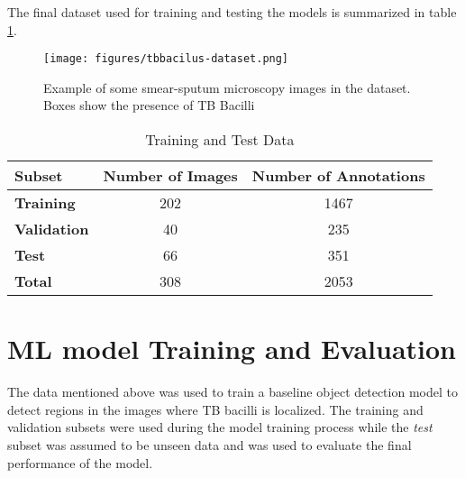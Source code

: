 \documentclass[../main.tex]{subfiles}
\begin{document}
    The final dataset used for training and testing the models is summarized in table \ref{tab:training-test-data}.

 
    \begin{figure}[ht]
     \centering
     \texttt{[image: figures/tbbacilus-dataset.png]}
     \caption{Example of some smear-sputum microscopy images in the dataset. Boxes show the presence of TB Bacilli }
     \label{fig:tbbacillus_image_examples}
 \end{figure}

 
 \begin{table}[h]
    \centering
    \caption{Training and Test Data}
    \label{tab:training-test-data}
    \begin{tabular}{l|c|c}
        \toprule
        \textbf{Subset} & \textbf{Number of Images} & \textbf{Number of Annotations} \\
        \midrule
        \textbf{Training} & 202 & 1467 \\
        \textbf{Validation} & 40 & 235 \\
        \textbf{Test} & 66 & 351 \\
        \midrule
        \textbf{Total} & 308 & 2053 \\
        \bottomrule
    \end{tabular}
\end{table}

\vspace{-0.4cm}
 \section{ML model Training and Evaluation}
\vspace{-0.4cm}

 The data mentioned above was used to train a baseline object detection model to detect regions in the images where TB bacilli is localized. The training and validation subsets were used during the model training process while the \textit{test} subset was assumed to be unseen data and was used to evaluate the final performance of the model.
\end{document}
